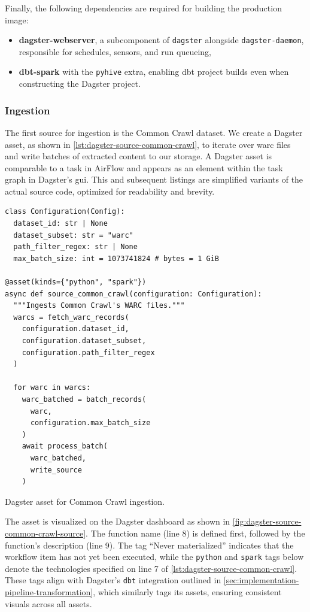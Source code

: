 Finally, the following dependencies are required for building the production image:

\begin{itemize}
    \item \textbf{dagster-webserver}, a subcomponent of \texttt{dagster} alongside \texttt{dagster-daemon}, responsible for schedules, sensors, and run queueing,
    \item \textbf{dbt-spark} with the \texttt{pyhive} extra, enabling dbt project builds even when constructing the Dagster project.
\end{itemize}


\subsubsection{Ingestion}
\label{sec:implementation-pipeline-ingestion}

The first source for ingestion is the Common Crawl dataset.
We create a Dagster asset, as shown in \cref{lst:dagster-source-common-crawl}, to iterate over \ac{warc} files and write batches of extracted content to our storage.
A Dagster asset is comparable to a task in AirFlow and appears as an element within the task graph in Dagster's \ac{gui}.
This and subsequent listings are simplified variants of the actual source code, optimized for readability and brevity.

\begin{listing}[H]
\begin{verbatim}
class Configuration(Config):
  dataset_id: str | None
  dataset_subset: str = "warc"
  path_filter_regex: str | None
  max_batch_size: int = 1073741824 # bytes = 1 GiB

@asset(kinds={"python", "spark"})
async def source_common_crawl(configuration: Configuration):
  """Ingests Common Crawl's WARC files."""
  warcs = fetch_warc_records(
    configuration.dataset_id,
    configuration.dataset_subset,
    configuration.path_filter_regex
  )

  for warc in warcs:
    warc_batched = batch_records(
      warc,
      configuration.max_batch_size
    )
    await process_batch(
      warc_batched,
      write_source
    )
\end{verbatim}
\caption{Dagster asset for Common Crawl ingestion.}
\label{lst:dagster-source-common-crawl}
\end{listing}

The asset is visualized on the Dagster dashboard as shown in \cref{fig:dagster-source-common-crawl-source}.
The function name (line 8) is defined first, followed by the function's description (line 9).
The tag ``Never materialized'' indicates that the workflow item has not yet been executed, while the \texttt{python} and \texttt{spark} tags below denote the technologies specified on line 7 of \cref{lst:dagster-source-common-crawl}.
These tags align with Dagster's \texttt{dbt} integration outlined in \cref{sec:implementation-pipeline-transformation}, which similarly tags its assets, ensuring consistent visuals across all assets.

